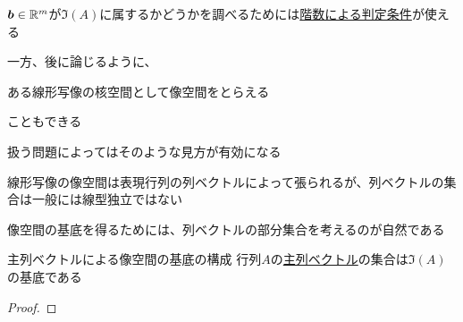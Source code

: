 \documentclass[../../../topic_linear-algebra]{subfiles}
\begin{document}
$\vb*{b} \in \mathbb{R}^m$が$\Im(A)$に属するかどうかを調べるためには\hyperref[thm:augmented-rank-solution-condition]{階数による判定条件}が使える

\sectionline

一方、後に論じるように、
\begin{shaded}
  ある線形写像の核空間として像空間をとらえる
\end{shaded}
こともできる

扱う問題によってはそのような見方が有効になる

\sectionline

線形写像の像空間は表現行列の列ベクトルによって張られるが、列ベクトルの集合は一般には線型独立ではない

像空間の基底を得るためには、列ベクトルの部分集合を考えるのが自然である

\begin{theorem}{主列ベクトルによる像空間の基底の構成}
  行列$A$の\hyperref[def:pivot-columns]{主列ベクトル}の集合は$\Im(A)$の基底である
\end{theorem}

\begin{proof}
\end{proof}
\end{document}
